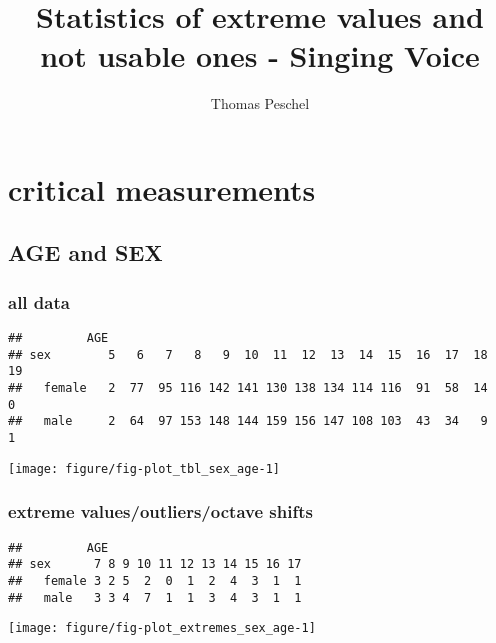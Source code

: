 \documentclass[a4]{article}\usepackage[]{graphicx}\usepackage[]{color}
\title{Statistics of extreme values and not usable ones - Singing Voice}
\author{Thomas Peschel}
\makeatletter
\def\maxwidth{ %
  \ifdim\Gin@nat@width>\linewidth
    \linewidth
  \else
    \Gin@nat@width
  \fi
}
\newenvironment{kframe}{%
 \def\at@end@of@kframe{}%
 \ifinner\ifhmode%
  \def\at@end@of@kframe{\end{minipage}}%
  \begin{minipage}{\columnwidth}%
 \fi\fi%
 \def\FrameCommand##1{\hskip\@totalleftmargin \hskip-\fboxsep
 \colorbox{shadecolor}{##1}\hskip-\fboxsep
     \hskip-\linewidth \hskip-\@totalleftmargin \hskip\columnwidth}%
 \MakeFramed {\advance\hsize-\width
   \@totalleftmargin\z@ \linewidth\hsize
   \@setminipage}}%
 {\par\unskip\endMakeFramed%
 \at@end@of@kframe}
\newenvironment{knitrout}{}{} %
\makeatother
\begin{document}
\maketitle
\tableofcontents
\newpage
\section{critical measurements}
\subsection{AGE and SEX}
\subsubsection{all data}
\begin{knitrout}
\color{fgcolor}\begin{kframe}
\begin{verbatim}
##         AGE
## sex        5   6   7   8   9  10  11  12  13  14  15  16  17  18  19
##   female   2  77  95 116 142 141 130 138 134 114 116  91  58  14   0
##   male     2  64  97 153 148 144 159 156 147 108 103  43  34   9   1
\end{verbatim}
\end{kframe}
\end{knitrout}
\begin{knitrout}
\color{fgcolor}
\texttt{[image: figure/fig-plot\_tbl\_sex\_age-1]} 

\end{knitrout}
\clearpage
\subsubsection{extreme values/outliers/octave shifts}
\begin{knitrout}
\color{fgcolor}\begin{kframe}
\begin{verbatim}
##         AGE
## sex      7 8 9 10 11 12 13 14 15 16 17
##   female 3 2 5  2  0  1  2  4  3  1  1
##   male   3 3 4  7  1  1  3  4  3  1  1
\end{verbatim}
\end{kframe}
\end{knitrout}
\begin{knitrout}
\color{fgcolor}
\texttt{[image: figure/fig-plot\_extremes\_sex\_age-1]} 

\end{knitrout}
\clearpage
\end{document}
